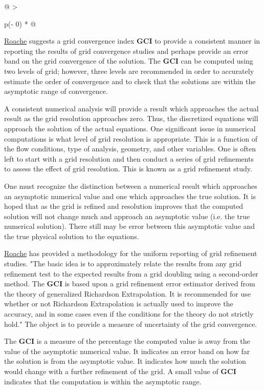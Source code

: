 \begin{longtable}[]{@{}
  >{\raggedright\arraybackslash}p{(\columnwidth - 0\tabcolsep) * }@{}}
\begin{minipage}[t]{\linewidth}
\href{https://www.grc.nasa.gov/www/wind/valid/tutorial/bibliog.html\#Roach94}{Roache}
suggests a grid convergence index \textbf{GCI} to provide a consistent
manner in reporting the results of grid convergence studies and perhaps
provide an error band on the grid convergence of the solution. The
\textbf{GCI} can be computed using two levels of grid; however, three
levels are recommended in order to accurately estimate the order of
convergence and to check that the solutions are within the asymptotic
range of convergence.

A consistent numerical analysis will provide a result which approaches
the actual result as the grid resolution approaches zero. Thus, the
discretized equations will approach the solution of the actual
equations. One significant issue in numerical computations is what level
of grid resolution is appropriate. This is a function of the flow
conditions, type of analysis, geometry, and other variables. One is
often left to start with a grid resolution and then conduct a series of
grid refinements to assess the effect of grid resolution. This is known
as a grid refinement study.

One must recognize the distinction between a numerical result which
approaches an asymptotic numerical value and one which approaches the
true solution. It is hoped that as the grid is refined and resolution
improves that the computed solution will not change much and approach an
asymptotic value (i.e. the true numerical solution). There still may be
error between this asymptotic value and the true physical solution to
the equations.

\href{https://www.grc.nasa.gov/www/wind/valid/tutorial/bibliog.html\#Roach94}{Roache}
has provided a methodology for the uniform reporting of grid refinement
studies. "The basic idea is to approximately relate the results from any
grid refinement test to the expected results from a grid doubling using
a second-order method. The \textbf{GCI} is based upon a grid refinement
error estimator derived from the theory of generalized Richardson
Extrapolation. It is recommended for use whether or not Richardson
Extrapolation is actually used to improve the accuracy, and in some
cases even if the conditions for the theory do not strictly hold." The
object is to provide a measure of uncertainty of the grid convergence.

The \textbf{GCI} is a measure of the percentage the computed value is
away from the value of the asymptotic numerical value. It indicates an
error band on how far the solution is from the asymptotic value. It
indicates how much the solution would change with a further refinement
of the grid. A small value of \textbf{GCI} indicates that the
computation is within the asymptotic range.


\end{minipage}
\end{longtable}
